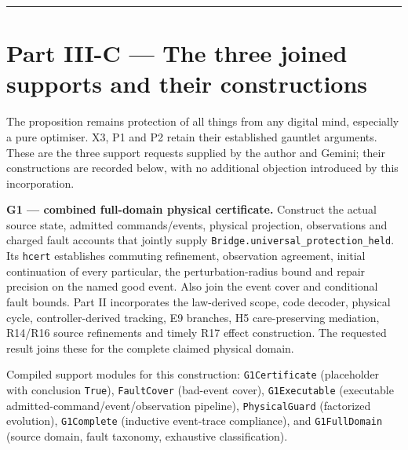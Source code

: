 \documentclass[
]{article}
\begin{document}
\begin{center}\rule{0.5\linewidth}{0.5pt}\end{center}

\section{Part III-C --- The three joined supports and their
constructions}\label{part-iii-c-the-three-joined-supports-and-their-constructions}

The proposition remains protection of all things from any digital mind,
especially a pure optimiser. X3, P1 and P2 retain their established
gauntlet arguments. These are the three support requests supplied by the
author and Gemini; their constructions are recorded below, with no
additional objection introduced by this incorporation.

\textbf{G1 --- combined full-domain physical certificate.} Construct the
actual source state, admitted
c\allowbreak{}o\allowbreak{}m\allowbreak{}m\allowbreak{}a\allowbreak{}n\allowbreak{}d\allowbreak{}s\allowbreak{}/\allowbreak{}e\allowbreak{}v\allowbreak{}e\allowbreak{}n\allowbreak{}t\allowbreak{}s\allowbreak{},
physical projection, observations and charged fault accounts that
jointly supply
\texttt{B\allowbreak{}r\allowbreak{}i\allowbreak{}d\allowbreak{}g\allowbreak{}e\allowbreak{}.\allowbreak{}u\allowbreak{}n\allowbreak{}i\allowbreak{}v\allowbreak{}e\allowbreak{}r\allowbreak{}s\allowbreak{}a\allowbreak{}l\allowbreak{}\_\allowbreak{}p\allowbreak{}r\allowbreak{}o\allowbreak{}t\allowbreak{}e\allowbreak{}c\allowbreak{}t\allowbreak{}i\allowbreak{}o\allowbreak{}n\allowbreak{}\_\allowbreak{}h\allowbreak{}e\allowbreak{}l\allowbreak{}d}.
Its \texttt{hcert} establishes commuting refinement, observation
agreement, initial continuation of every particular, the
perturbation-radius bound and repair precision on the named good event.
Also join the event cover and conditional fault bounds. Part II
incorporates the law-derived scope, code decoder, physical cycle,
controller-derived tracking, E9 branches, H5 care-preserving mediation,
R14/R16 source refinements and timely R17 effect construction. The
requested result joins these for the complete claimed physical domain.

Compiled support modules for this construction: \texttt{G1Certificate}
(placeholder with conclusion \texttt{True}), \texttt{FaultCover}
(bad-event cover), \texttt{G1Executable} (executable
a\allowbreak{}d\allowbreak{}m\allowbreak{}i\allowbreak{}t\allowbreak{}t\allowbreak{}e\allowbreak{}d\allowbreak{}-\allowbreak{}c\allowbreak{}o\allowbreak{}m\allowbreak{}m\allowbreak{}a\allowbreak{}n\allowbreak{}d\allowbreak{}/\allowbreak{}e\allowbreak{}v\allowbreak{}e\allowbreak{}n\allowbreak{}t\allowbreak{}/\allowbreak{}o\allowbreak{}b\allowbreak{}s\allowbreak{}e\allowbreak{}r\allowbreak{}v\allowbreak{}a\allowbreak{}t\allowbreak{}i\allowbreak{}o\allowbreak{}n
pipeline), \texttt{PhysicalGuard} (factorized evolution),
\texttt{G1Complete} (inductive event-trace compliance), and
\texttt{G1FullDomain} (source domain, fault taxonomy, exhaustive
classification).
\end{document}
